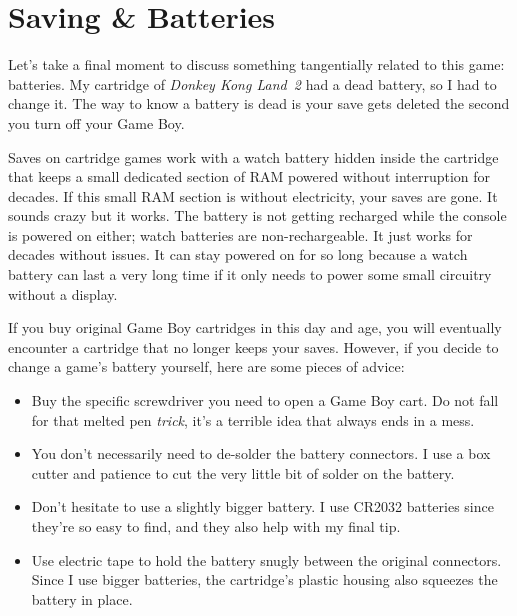 \documentclass{book}
\begin{document}
\FloatBarrier\section*{Saving \& Batteries}
Let’s take a final moment to discuss something tangentially related to this game: batteries. My cartridge of \emph{Donkey Kong Land~2} had a dead battery, so I had to change it. The way to know a battery is dead is your save gets deleted the second you turn off your Game Boy.\par
Saves on cartridge games work with a watch battery hidden inside the cartridge that keeps a small dedicated section of RAM powered without interruption for decades. If this small RAM section is without electricity, your saves are gone. It sounds crazy but it works. The battery is not getting recharged while the console is powered on either; watch batteries are non-rechargeable. It just works for decades without issues. It can stay powered on for so long because a watch battery can last a very long time if it only needs to power some small circuitry without a display.\par
\FloatBarrier\vspace{\baselineskip}\begin{figure}[H]\end{figure}
If you buy original Game Boy cartridges in this day and age, you will eventually encounter a cartridge that no longer keeps your saves. However, if you decide to change a game’s battery yourself, here are some pieces of advice:\par
\begin{itemize}

\item Buy the specific screwdriver you need to open a Game Boy cart. Do not fall for that melted pen \emph{trick}, it’s a terrible idea that always ends in a mess.
\item You don’t necessarily need to de-solder the battery connectors. I use a box cutter and patience to cut the very little bit of solder on the battery.
\item Don’t hesitate to use a slightly bigger battery. I use CR2032 batteries since they’re so easy to find, and they also help with my final tip.
\item Use electric tape to hold the battery snugly between the original connectors. Since I use bigger batteries, the cartridge’s plastic housing also squeezes the battery in place.

\end{itemize}
\end{document}

